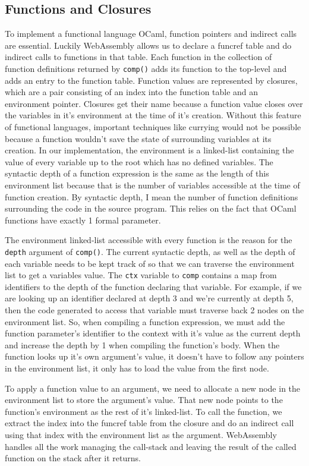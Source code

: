 \documentclass[12pt,a4paper,twoside,openright]{report}
\begin{document}
\subsection{Functions and Closures}
To implement a functional language OCaml, function pointers and indirect calls are essential.
Luckily WebAssembly allows us to declare a funcref table and do indirect calls to functions in that table.
Each function in the collection of function definitions returned by {\tt comp()} adds its function to the top-level and adds an entry to the function table.
Function values are represented by closures, which are a pair consisting of an index into the function table and an environment pointer.
Closures get their name because a function value closes over the variables in it's environment at the time of it's creation.
Without this feature of functional languages, important techniques like currying would not be possible because a function wouldn't save the state of surrounding variables at its creation.
In our implementation, the environment is a linked-list containing the value of every variable up to the root which has no defined variables.
The syntactic depth of a function expression is the same as the length of this environment list because that is the number of variables accessible at the time of function creation.
By syntactic depth, I mean the number of function definitions surrounding the code in the source program.
This relies on the fact that OCaml functions have exactly 1 formal parameter.

The environment linked-list accessible with every function is the reason for the {\tt depth} argument of {\tt comp()}.
The current syntactic depth, as well as the depth of each variable needs to be kept track of so that we can traverse the environment list to get a variables value.
The {\tt ctx} variable to {\tt comp} contains a map from identifiers to the depth of the function declaring that variable.
For example, if we are looking up an identifier declared at depth 3 and we're currently at depth 5, then the code generated to access that variable must traverse back 2 nodes on the environment list.
So, when compiling a function expression, we must add the function parameter's identifier to the context with it's value as the current depth and increase the depth by 1 when compiling the function's body.
When the function looks up it's own argument's value, it doesn't have to follow any pointers in the environment list, it only has to load the value from the first node.

To apply a function value to an argument, we need to allocate a new node in the environment list to store the argument's value.
That new node points to the function's environment as the rest of it's linked-list.
To call the function, we extract the index into the funcref table from the closure and do an indirect call using that index with the environment list as the argument.
WebAssembly handles all the work managing the call-stack and leaving the result of the called function on the stack after it returns.
\end{document}
